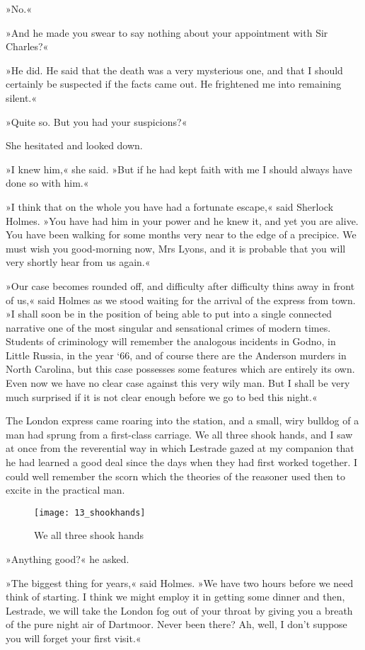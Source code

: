 »No.«

»And he made you swear to say nothing about your appointment with Sir Charles?«

»He did. He said that the death was a very mysterious one, and that I should certainly be suspected if the facts came out. He frightened me into remaining silent.«

»Quite so. But you had your suspicions?«

She hesitated and looked down.

»I knew him,« she said. »But if he had kept faith with me I should always have done so with him.«

»I think that on the whole you have had a fortunate escape,« said Sherlock Holmes. »You have had him in your power and he knew it, and yet you are alive. You have been walking for some months very near to the edge of a precipice. We must wish you good-morning now, Mrs Lyons, and it is probable that you will very shortly hear from us again.«

»Our case becomes rounded off, and difficulty after difficulty thins away in front of us,« said Holmes as we stood waiting for the arrival of the express from town. »I shall soon be in the position of being able to put into a single connected narrative one of the most singular and sensational crimes of modern times. Students of criminology will remember the analogous incidents in Godno, in Little Russia, in the year `66, and of course there are the Anderson murders in North Carolina, but this case possesses some features which are entirely its own. Even now we have no clear case against this very wily man. But I shall be very much surprised if it is not clear enough before we go to bed this night.«

The London express came roaring into the station, and a small, wiry bulldog of a man had sprung from a first-class carriage. We all three shook hands, and I saw at once from the reverential way in which Lestrade gazed at my companion that he had learned a good deal since the days when they had first worked together. I could well remember the scorn which the theories of the reasoner used then to excite in the practical man.

\begin{figure}[p]
\centering
\texttt{[image: 13\_shookhands]}
\caption{We all three shook hands}
\end{figure}

»Anything good?« he asked.

»The biggest thing for years,« said Holmes. »We have two hours before we need think of starting. I think we might employ it in getting some dinner and then, Lestrade, we will take the London fog out of your throat by giving you a breath of the pure night air of Dartmoor. Never been there? Ah, well, I don't suppose you will forget your first visit.«

